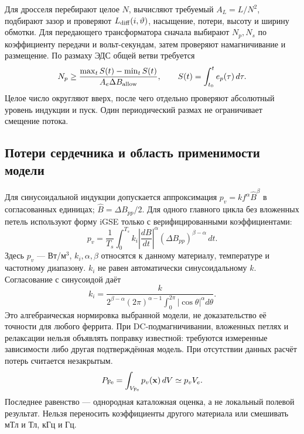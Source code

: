 \documentclass[14pt,a4paper]{extarticle}
\begin{document}
Для дросселя перебирают целое $N$, вычисляют требуемый $A_L=L/N^2$, подбирают зазор и проверяют $L_{\rm diff}(i,\vartheta)$, насыщение, потери, высоту и ширину обмотки. Для передающего трансформатора сначала выбирают $N_p,N_s$ по коэффициенту передачи и вольт-секундам, затем проверяют намагничивание и размещение. По размаху ЭДС общей ветви требуется
\begin{equation}
 N_p\geq\frac{\max_t S(t)-\min_t S(t)}{A_e\Delta B_{\rm allow}},
 \qquad S(t)=\int_{t_0}^t e_p(\tau)\,d\tau.
 \label{eq:turns-volts}
\end{equation}
Целое число округляют вверх, после чего отдельно проверяют абсолютный уровень индукции и пуск. Один периодический размах не ограничивает смещение потока.

\subsection{Потери сердечника и область применимости модели}
Для синусоидальной индукции допускается аппроксимация $p_v=k f^\alpha\widehat B^\beta$ в согласованных единицах; $\widehat B=\Delta B_{pp}/2$. Для одного главного цикла без вложенных петель используют форму iGSE только с верифицированными коэффициентами:
\begin{equation}
 p_v=\frac1{T_s}\int_0^{T_s}k_i\left|\frac{dB}{dt}\right|^\alpha
 (\Delta B_{pp})^{\beta-\alpha}\,dt.
 \label{eq:igse}
\end{equation}
Здесь $p_v$ --- Вт/м$^3$, $k_i,\alpha,\beta$ относятся к данному материалу, температуре и частотному диапазону. $k_i$ не равен автоматически синусоидальному $k$. Согласование с синусоидой даёт
\begin{equation}
 k_i=\frac{k}{2^{\beta-\alpha}(2\pi)^{\alpha-1}
 \int_0^{2\pi}|\cos\theta|^\alpha d\theta}.
 \label{eq:igse-coefficient}
\end{equation}
Это алгебраическая нормировка выбранной модели, не доказательство её точности для любого феррита. При DC-подмагничивании, вложенных петлях и релаксации нельзя объявлять поправку известной: требуются измеренные зависимости либо другая подтверждённая модель. При отсутствии данных расчёт потерь считается незакрытым.
\begin{equation}
 P_{\rm Fe}=\int_{V_{\rm Fe}}p_v(\mathbf x)\,dV\simeq p_v V_e.
 \label{eq:core-loss-volume}
\end{equation}
Последнее равенство --- однородная каталожная оценка, а не локальный полевой результат. Нельзя переносить коэффициенты другого материала или смешивать мТл и Тл, кГц и Гц.
\end{document}
